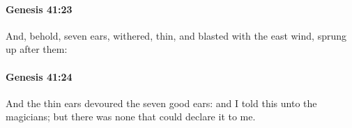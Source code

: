 		\paragraph{Genesis 41:23} %
			\label{GENESIS-41-23}

			And, behold, seven ears, withered, thin, and blasted with the east wind, sprung up after them:


		\paragraph{Genesis 41:24} %
			\label{GENESIS-41-24}

			And the thin ears devoured the seven good ears: and I told this unto the magicians; but there was none that could declare it to me.


